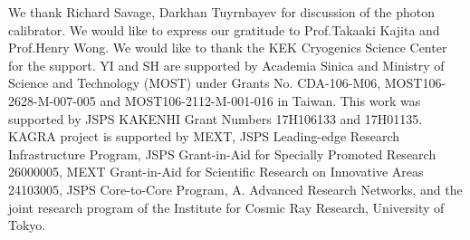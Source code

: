 \documentclass[%
 reprint,
superscriptaddress,
 amsmath,amssymb,
 aps,
]{revtex4-1}
\begin{document}
\acknowledgments     %
 
We thank Richard Savage, Darkhan Tuyrnbayev for discussion of the photon calibrator. We would like to express our gratitude to Prof.Takaaki Kajita and Prof.Henry Wong. We would like to thank the KEK Cryogenics Science Center for the support. YI and SH are supported by Academia Sinica and Ministry of Science and Technology (MOST) under Grants No. CDA-106-M06, MOST106-2628-M-007-005 and MOST106-2112-M-001-016 in Taiwan. This work was supported by JSPS KAKENHI Grant Numbers 17H106133 and 17H01135. KAGRA project is supported by MEXT, JSPS Leading-edge Research Infrastructure Program, JSPS Grant-in-Aid for Specially Promoted Research 26000005, MEXT Grant-in-Aid for Scientific Research on Innovative Areas 24103005, JSPS Core-to-Core Program, A. Advanced Research Networks, and the joint research program of the Institute for Cosmic Ray Research, University of Tokyo.


\end{document}
